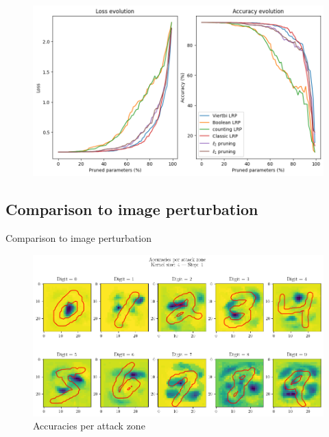 \documentclass[aspectratio=169]{beamer}
\theoremstyle{definition}
\begin{document}
\begin{frame}
    \begin{figure}
        \includegraphics[width=.9\textwidth]{pruning-graph-large.png}
    \end{figure}
\end{frame}

\subsection{Comparison to image perturbation}
\begin{frame}{Comparison to image perturbation \cite{fong2017interpretable}}
    \begin{figure}
        \includegraphics[width=.75\textwidth]{attacks.png}
        \caption{Accuracies per attack zone}
    \end{figure}
\end{frame}

\begin{frame}
    \nocite{*}
    \printbibliography
\end{frame}
\end{document}
